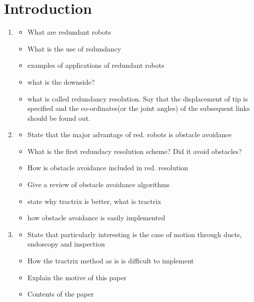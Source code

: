 \documentclass[12pt,a4]{article}
\begin{document}
\section{Introduction}
\label{sec:introduction}
\begin{enumerate}
\item
\begin{itemize}
\item What are redundant robots
\item What is the use of redundancy
\item examples of applications of redundant robots
\item what is the downside?
\item what is called redundancy resolution. Say that the displacement of tip is specified and the co-ordinates(or the joint angles) of the subsequent links should be found out.
\end{itemize}

\item
\begin{itemize}
\item State that the major advantage of red. robots is obstacle avoidance
\item What is the first redundacy resolution scheme? Did it avoid obstacles?
\item How is obstacle avoidance included in red. resolution
\item Give a review of obstacle avoidance algorithms
\item state why tractrix is better, what is tractrix
\item how obstacle avoidance is easily implemented
\end{itemize}

\item
\begin{itemize}
\item State that particularly interesting is the case of motion through ducts, endoscopy and inspection
\item How the tractrix method as is is difficult to implement
\item Explain the motive of this paper
\item Contents of the paper
\end{itemize}
\end{enumerate}
\end{document}
